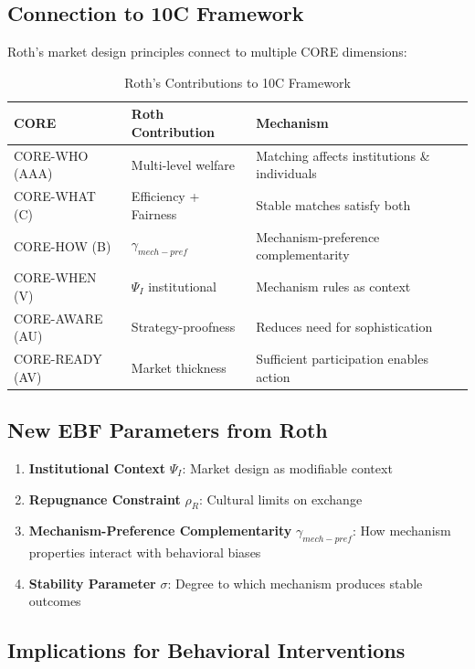 \subsection{Connection to 10C Framework}

Roth's market design principles connect to multiple CORE dimensions:

\begin{table}[h]
\centering
\caption{Roth's Contributions to 10C Framework}
\label{tab:roth-9c}
\begin{tabular}{lll}
\toprule
\textbf{CORE} & \textbf{Roth Contribution} & \textbf{Mechanism} \\
\midrule
CORE-WHO (AAA) & Multi-level welfare & Matching affects institutions \& individuals \\
CORE-WHAT (C) & Efficiency + Fairness & Stable matches satisfy both \\
CORE-HOW (B) & $\gamma_{mech-pref}$ & Mechanism-preference complementarity \\
CORE-WHEN (V) & $\Psi_I$ institutional & Mechanism rules as context \\
CORE-AWARE (AU) & Strategy-proofness & Reduces need for sophistication \\
CORE-READY (AV) & Market thickness & Sufficient participation enables action \\
\bottomrule
\end{tabular}
\end{table}

\subsection{New EBF Parameters from Roth}

\begin{enumerate}
    \item \textbf{Institutional Context} $\Psi_I$: Market design as modifiable context
    \item \textbf{Repugnance Constraint} $\rho_R$: Cultural limits on exchange
    \item \textbf{Mechanism-Preference Complementarity} $\gamma_{mech-pref}$: How mechanism properties interact with behavioral biases
    \item \textbf{Stability Parameter} $\sigma$: Degree to which mechanism produces stable outcomes
\end{enumerate}

\subsection{Implications for Behavioral Interventions}

